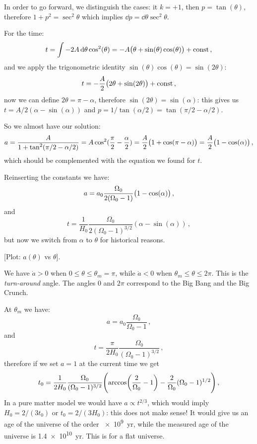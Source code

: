 \documentclass[main.tex]{subfiles}
\begin{document}
In order to go forward, we distinguish the cases: it \(k = +1\), then \(p = \tan(\theta ) \), therefore \(1 + p^2= \sec^2 \theta \) which implies \(\dd{p} = \dd{\theta } \sec^2 \theta  \).

For the time: 
%
\begin{equation}
  t = \int -2A \dd{\theta } \cos^2(\theta ) = -A \qty(\theta + \sin(\theta ) \cos(\theta ) ) + \text{const}
\,,
\end{equation}
%
and we apply the trigonometric identity \(\sin(\theta ) \cos(\theta ) = \sin(2 \theta ) \):
%
\begin{equation}
  t = -\frac{A}{2} \qty(2 \theta  + \sin(2 \theta ) ) + \text{const}
\,,
\end{equation}
%
now we can define \(2 \theta  = \pi - \alpha \), therefore \(\sin(2\theta ) = \sin(\alpha )  \): this gives us
\(t = A/2 (\alpha - \sin(\alpha ) )\) and \(p = 1/\tan(\alpha /2) = \tan(\pi /2 - \alpha /2) \).

So we almost have our solution: 
%
\begin{equation}
  a = \frac{A}{1 + \tan^2(\pi /2 - \alpha /2)} = A \cos^2(\frac{\pi}{2} - \frac{\alpha}{2})  = \frac{A}{2} \qty(1+\cos(\pi - \alpha ) ) = \frac{A}{2} \qty(1- \cos(\alpha ) )
\,,
\end{equation}
which should be complemented with the equation we found for \(t\).

Reinserting the constants we have:
%
\begin{equation}
  a = a_0 \frac{\Omega_0}{2 (\Omega_0 -1)} \qty(1- \cos(\alpha ) ) 
\,,
\end{equation}
%
and
%
\begin{equation}
  t = \frac{1}{H_0 } \frac{\Omega_0}{2 (\Omega_0 -1)^{3/2}}(\alpha - \sin(\alpha ) )
\,,
\end{equation}
%
but now we switch from \(\alpha \) to \(\theta \) for historical reasons.

[Plot: \(a(\theta )\) vs \(\theta \)].

We have \(\dot{a} > 0 \)   when \(0 \leq \theta \leq \theta_m = \pi \), while \(\dot{a} < 0\) when \(\theta _m \leq \theta \leq 2 \pi \).
This is the \emph{turn-around} angle. The angles \(0\) and \(2 \pi \) correspond to the Big Bang and the Big Crunch.

At \(\theta _m\) we have: 
%
\begin{equation}
  a = a_0 \frac{\Omega_0}{\Omega_0 -1} 
\,,
\end{equation}
%
and 
%
\begin{equation}
  t = \frac{\pi}{2 H_0 } \frac{\Omega_0}{(\Omega_0 -1)^{3/2}}
\,,
\end{equation}
%
therefore if we set \(a=1\) at the current time we get 
%
\begin{equation}
  t_0 = \frac{1}{2H_0 } \frac{\Omega_0  }{(\Omega_0 -1)^{3/2}} \qty(\arccos (\frac{2}{\Omega_0 }-1) - \frac{2}{\Omega_0 } (\Omega_0 -1 )^{1/2})
\,,
\end{equation}
%
In a pure matter model we would have \(a \propto t^{2/3}\), which would imply \(H_0 = 2/(3 t_0 )\) or \(t_0 = 2 / (3 H_0 )\): this does not make sense! It would give us an age of the universe of the order \SI{e9}{yr}, while the measured age of the universe is \SI{1.4e10}{yr}.
This is for a flat universe.
\end{document}
